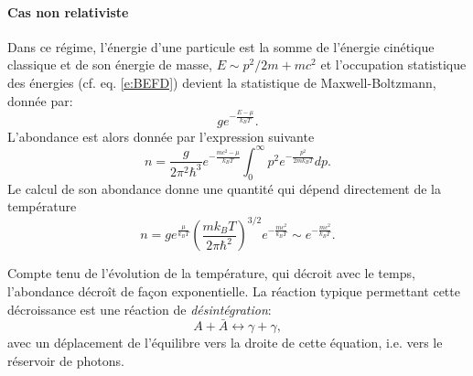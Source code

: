 \paragraph{Cas non relativiste}
Dans ce régime, l'énergie d'une particule est la somme de l'énergie cinétique classique et de son énergie de masse, $E\sim p^2/2m +mc^2$ et l'occupation statistique des énergies (cf. eq. \ref{e:BEFD}) devient la statistique de  Maxwell-Boltzmann, donnée par:
\begin{equation}
g e^{-\frac{E-\mu}{k_B T}}.
\end{equation}
 L'abondance est alors donnée par l'expression suivante 
\begin{equation}
n=\frac{g}{2\pi^2 \hbar^3}e^{-\frac{mc^2-\mu}{k_BT}}\int_0^\infty p^2 e^{-\frac{p^2}{2mk_B T}}dp.
\end{equation} 
 Le calcul de son abondance donne une quantité qui dépend directement de la température
\begin{equation}
n=ge^{\frac{\mu}{k_BT}}\left(\frac{m k_B T}{2\pi\hbar^2}\right)^{3/2}e^{-\frac{mc^2}{k_B T}}\sim e^{-\frac{mc^2}{k_B T}}.
\label{e:nonrel}
\end{equation}


Compte tenu de l'évolution de la température, qui décroit avec le temps, l'abondance décroît de façon exponentielle. La réaction typique permettant cette décroissance est une réaction de \textit{désintégration}:
\begin{equation}
A+\bar A \leftrightarrow \gamma+\gamma,
\end{equation}
avec un déplacement de l'équilibre vers la droite de cette équation, i.e. vers le réservoir de photons.


